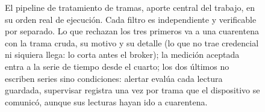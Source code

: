 \begin{figure}[H]
{}
\caption[El pipeline de tratamiento de tramas]{El pipeline de tratamiento de tramas, aporte central del trabajo, en su orden real de
ejecución. Cada filtro es independiente y verificable por separado. Lo que rechazan los tres primeros
va a una cuarentena con la trama cruda, su motivo y su detalle (lo que no trae credencial ni siquiera
llega: lo corta antes el broker); la medición aceptada entra a la serie de tiempo
desde el cuarto; los dos últimos no escriben series sino condiciones: alertar evalúa cada lectura
guardada, supervisar registra una vez por trama que el dispositivo se comunicó, aunque sus lecturas
hayan ido a cuarentena.}
\label{fig:pipeline}
\end{figure}
